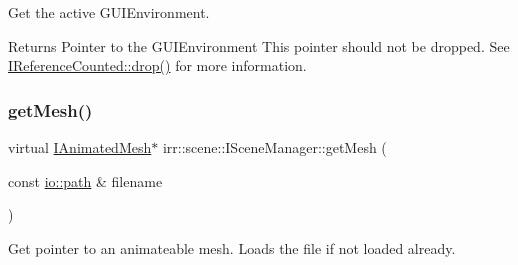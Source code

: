 Get the active G\+U\+I\+Environment. 

\begin{DoxyReturn}{Returns}
Pointer to the G\+U\+I\+Environment This pointer should not be dropped. See \hyperlink{classirr_1_1IReferenceCounted_a03856a09355b89d178090c4a5f738543}{I\+Reference\+Counted\+::drop()} for more information. 
\end{DoxyReturn}
\mbox{\label{classirr_1_1scene_1_1ISceneManager_a63894c3f3d46cfc385116f1705935e03}} 
\subsubsection{\texorpdfstring{get\+Mesh()}{getMesh()}\hspace{0.1cm}{\footnotesize\ttfamily [1/2]}}
{\footnotesize\ttfamily virtual \hyperlink{classirr_1_1scene_1_1IAnimatedMesh}{I\+Animated\+Mesh}$\ast$ irr\+::scene\+::\+I\+Scene\+Manager\+::get\+Mesh (\begin{DoxyParamCaption}\item[{const \hyperlink{namespaceirr_1_1io_ab1bdc45edb3f94d8319c02bc0f840ee1}{io\+::path} \&}]{filename }\end{DoxyParamCaption})\hspace{0.3cm}{\ttfamily [pure virtual]}}



Get pointer to an animateable mesh. Loads the file if not loaded already. 

